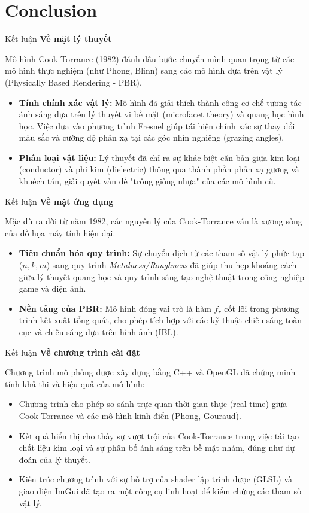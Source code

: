\documentclass[11pt, aspectratio=169]{beamer}
\begin{document}
\section{Conclusion}
\begin{frame}{Kết luận}
	\textbf{Về mặt lý thuyết}
	
	Mô hình Cook-Torrance (1982) đánh dấu bước chuyển mình quan trọng từ các mô hình thực nghiệm (như Phong, Blinn) sang các mô hình dựa trên vật lý (Physically Based Rendering - PBR).
	\begin{itemize}
		\item \textbf{Tính chính xác vật lý:} Mô hình đã giải thích thành công cơ chế tương tác ánh sáng dựa trên lý thuyết vi bề mặt (microfacet theory) và quang học hình học. Việc đưa vào phương trình Fresnel giúp tái hiện chính xác sự thay đổi màu sắc và cường độ phản xạ tại các góc nhìn nghiêng (grazing angles).
		\item \textbf{Phân loại vật liệu:} Lý thuyết đã chỉ ra sự khác biệt căn bản giữa kim loại (conductor) và phi kim (dielectric) thông qua thành phần phản xạ gương và khuếch tán, giải quyết vấn đề "trông giống nhựa" của các mô hình cũ.
	\end{itemize}
\end{frame}

\begin{frame}{Kết luận}
	\textbf{Về mặt ứng dụng}
	
	Mặc dù ra đời từ năm 1982, các nguyên lý của Cook-Torrance vẫn là xương sống của đồ họa máy tính hiện đại.
	\begin{itemize}
		\item \textbf{Tiêu chuẩn hóa quy trình:} Sự chuyển dịch từ các tham số vật lý phức tạp ($n, k, m$) sang quy trình \textit{Metalness/Roughness} đã giúp thu hẹp khoảng cách giữa lý thuyết quang học và quy trình sáng tạo nghệ thuật trong công nghiệp game và điện ảnh.
		\item \textbf{Nền tảng của PBR:} Mô hình đóng vai trò là hàm $f_r$ cốt lõi trong phương trình kết xuất tổng quát, cho phép tích hợp với các kỹ thuật chiếu sáng toàn cục và chiếu sáng dựa trên hình ảnh (IBL).
	\end{itemize}
\end{frame}

\begin{frame}{Kết luận}
	\textbf{Về chương trình cài đặt}
	
	Chương trình mô phỏng được xây dựng bằng C++ và OpenGL đã chứng minh tính khả thi và hiệu quả của mô hình:
	\begin{itemize}
		\item Chương trình cho phép so sánh trực quan thời gian thực (real-time) giữa Cook-Torrance và các mô hình kinh điển (Phong, Gouraud).
		\item Kết quả hiển thị cho thấy sự vượt trội của Cook-Torrance trong việc tái tạo chất liệu kim loại và sự phân bố ánh sáng trên bề mặt nhám, đúng như dự đoán của lý thuyết.
		\item Kiến trúc chương trình với sự hỗ trợ của shader lập trình được (GLSL) và giao diện ImGui đã tạo ra một công cụ linh hoạt để kiểm chứng các tham số vật lý.
	\end{itemize}
\end{frame}
\end{document}
